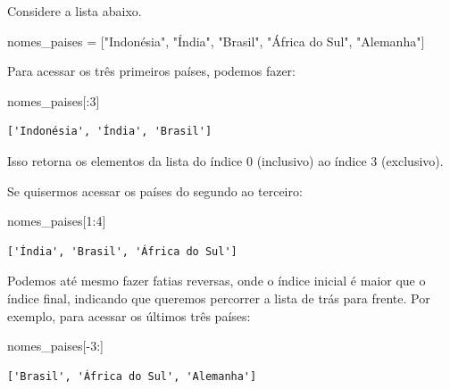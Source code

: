 \documentclass[
  portuguese,
  letterpaper,
  DIV=11,
  numbers=noendperiod]{scrreprt}
\newenvironment{Shaded}{\begin{snugshade}}{\end{snugshade}}
\newcommand{\DecValTok}[1]{\textcolor[rgb]{0.68,0.00,0.00}{#1}}
\newcommand{\NormalTok}[1]{\textcolor[rgb]{0.00,0.23,0.31}{#1}}
\newcommand{\OperatorTok}[1]{\textcolor[rgb]{0.37,0.37,0.37}{#1}}
\newcommand{\StringTok}[1]{\textcolor[rgb]{0.13,0.47,0.30}{#1}}
\theoremstyle{definition}
\theoremstyle{remark}
\begin{document}
Considere a lista abaixo.

\begin{Shaded}
\begin{Highlighting}[]
\NormalTok{nomes\_paises }\OperatorTok{=}\NormalTok{ [}\StringTok{"Indonésia"}\NormalTok{, }\StringTok{"Índia"}\NormalTok{, }\StringTok{"Brasil"}\NormalTok{, }\StringTok{"África do Sul"}\NormalTok{, }\StringTok{"Alemanha"}\NormalTok{]}
\end{Highlighting}
\end{Shaded}

Para acessar os três primeiros países, podemos fazer:

\begin{Shaded}
\begin{Highlighting}[]
\NormalTok{nomes\_paises[:}\DecValTok{3}\NormalTok{]}
\end{Highlighting}
\end{Shaded}

\begin{verbatim}
['Indonésia', 'Índia', 'Brasil']
\end{verbatim}

Isso retorna os elementos da lista do índice 0 (inclusivo) ao índice 3
(exclusivo).

Se quisermos acessar os países do segundo ao terceiro:

\begin{Shaded}
\begin{Highlighting}[]
\NormalTok{nomes\_paises[}\DecValTok{1}\NormalTok{:}\DecValTok{4}\NormalTok{]}
\end{Highlighting}
\end{Shaded}

\begin{verbatim}
['Índia', 'Brasil', 'África do Sul']
\end{verbatim}

Podemos até mesmo fazer fatias reversas, onde o índice inicial é maior
que o índice final, indicando que queremos percorrer a lista de trás
para frente. Por exemplo, para acessar os últimos três países:

\begin{Shaded}
\begin{Highlighting}[]
\NormalTok{nomes\_paises[}\OperatorTok{{-}}\DecValTok{3}\NormalTok{:]}
\end{Highlighting}
\end{Shaded}

\begin{verbatim}
['Brasil', 'África do Sul', 'Alemanha']
\end{verbatim}
\end{document}
